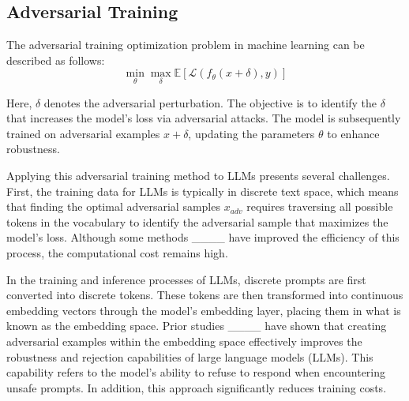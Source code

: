 \subsection{Adversarial Training}



The adversarial training optimization problem in machine learning can be described as follows:
\begin{equation}
\label{equa:AT1}
\min_{\theta} \max_{\delta} \mathbb{E} \left[ \mathcal{L} \left( f_{\theta} \left( x + \delta \right), y \right) \right]
\end{equation}

Here, $\delta$ denotes the adversarial perturbation. The objective is to identify the $\delta$ that increases the model's loss via adversarial attacks. The model is subsequently trained on adversarial examples $x + \delta$, updating the parameters $\theta$ to enhance robustness.


Applying this adversarial training method to LLMs presents several challenges. First, the training data for LLMs is typically in discrete text space, which means that finding the optimal adversarial samples $x_{adv}$ requires traversing all possible tokens in the vocabulary to identify the adversarial sample that maximizes the model's loss. Although some methods ____ have improved the efficiency of this process, the computational cost remains high.

In the training and inference processes of LLMs, discrete prompts are first converted into discrete tokens. These tokens are then transformed into continuous embedding vectors through the model's embedding layer, placing them in what is known as the embedding space. Prior studies ____ have shown that creating adversarial examples within the embedding space effectively improves the robustness and rejection capabilities of large language models (LLMs). This capability refers to the model's ability to refuse to respond when encountering unsafe prompts. In addition, this approach significantly reduces training costs. 


